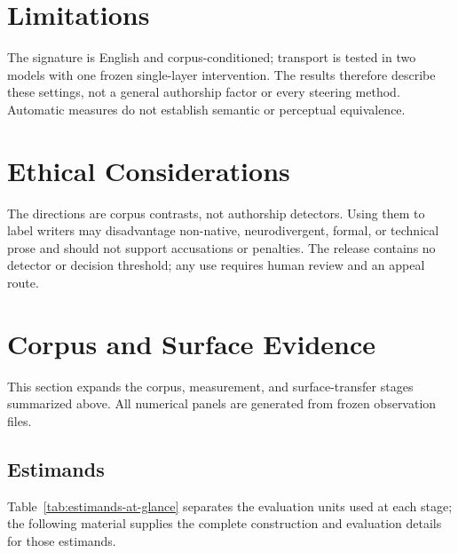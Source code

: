 \section{Limitations}

The signature is English and corpus-conditioned; transport is tested in two models with one frozen single-layer intervention. The results therefore describe these settings, not a general authorship factor or every steering method. Automatic measures do not establish semantic or perceptual equivalence.

\section{Ethical Considerations}

The directions are corpus contrasts, not authorship detectors. Using them to label writers may disadvantage non-native, neurodivergent, formal, or technical prose and should not support accusations or penalties. The release contains no detector or decision threshold; any use requires human review and an appeal route.

\section{Corpus and Surface Evidence}
\label{app:moved-overview}
\label{app:method-detail}

This section expands the corpus, measurement, and surface-transfer stages summarized above. All numerical panels are generated from frozen observation files.

\subsection{Estimands}

Table~\ref{tab:estimands-at-glance} separates the evaluation units used at each stage; the following material supplies the complete construction and evaluation details for those estimands.

